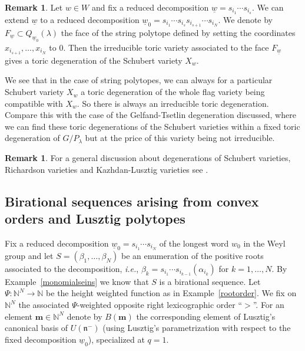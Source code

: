 \documentclass{emsprocart}
\theoremstyle{definition}
\newtheorem{remark}[theorem]{Remark}
\begin{document}
\begin{remark}
Let $w \in W$ and fix a reduced decomposition $\underline{w} = s_{i_1} \cdots s_{i_s}$. We can extend $\underline{w}$ to a reduced decomposition ${\underline{w}_0} = s_{i_1} \cdots s_{i_s} s_{i_{s+1}} \cdots s_{i_N}$. We denote by $F_{\underline{w}} \subset Q_{{\underline{w}_0}}(\lambda)$ the face of the string polytope defined by setting the coordinates $x_{i_{s+1}}, \ldots, x_{i_N}$ to $0$. Then the irreducible toric variety associated to the face $F_{\underline{w}}$ gives a toric degeneration of the Schubert variety $X_w$.
\par
We see that in the case of string polytopes, we can always  for a particular Schubert variety $X_w$ a toric degeneration of the whole flag variety being compatible with $X_w$. So there is always an irreducible toric degeneration. Compare this with the case of the Gelfand-Tsetlin degeneration discussed, where we can find these toric degenerations of the Schubert varieties within a fixed toric degeneration of $G/P_\lambda$ but at the price of this variety being not irreducible.
\end{remark}
\begin{remark}
For a general discussion about degenerations of Schubert varieties, Richardson varieties and Kazhdan-Lusztig varieties see \cite{Kn}.
\end{remark}



\subsection{Birational sequences arising from convex orders and Lusztig polytopes}\label{Lusztig}
Fix a reduced decomposition $\underline{w}_0=s_{i_1}\cdots s_{i_N}$ of the longest word $w_0$ in the Weyl group and let $S=(\beta_1,\ldots,\beta_N)$ be an enumeration of the positive roots associated to the decomposition, \emph{i.e.}, $\beta_k=s_{i_1}\cdots s_{i_{k-1}}(\alpha_{i_k})$ for $k=1,\ldots,N$. By Example~\ref{monomialseins} we know that
$S$ is a birational sequence. Let $\Psi:\mathbb N^N\rightarrow \mathbb N$ be the height weighted function
as in Example~\ref{rootorder}. We fix on $\mathbb N^N$ the associated  $\Psi$-weighted opposite right
 lexicographic order ``$>$''.
For an element $\mathbf m\in \mathbb N^N$ denote by $B(\mathbf m)$ the corresponding element
of Lusztig's canonical basis of $U(\mathfrak n^-)$ (using Lusztig's parametrization with respect to the fixed decomposition $\underline{w}_0$),
specialized at $q=1$.
\end{document}
